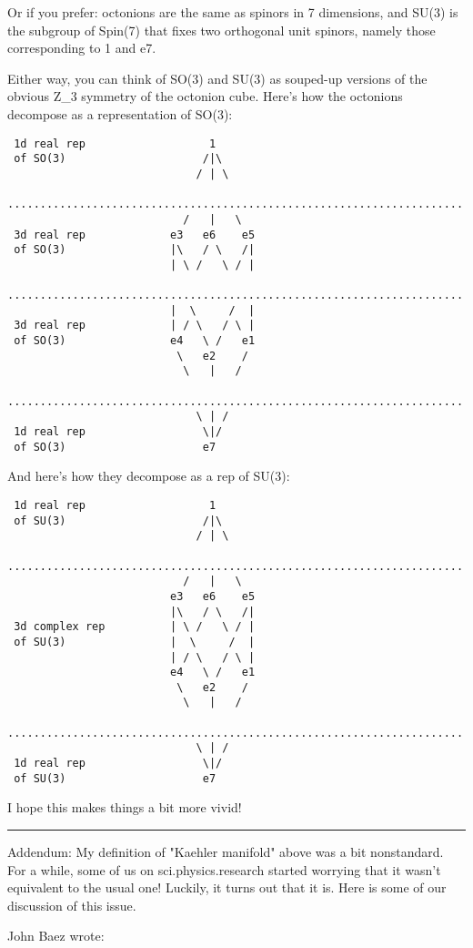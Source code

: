 Or if you prefer: octonions are the same as spinors in 7 dimensions, 
and SU(3) is the subgroup of Spin(7) that fixes two orthogonal 
unit spinors, namely those corresponding to 1 and e7.

Either way, you can think of SO(3) and SU(3) as souped-up versions
of the obvious Z_{3} symmetry of the octonion cube.  Here's how
the octonions decompose as a representation of SO(3):


\begin{verbatim}
 1d real rep                   1
 of SO(3)                     /|\
                             / | \
 ......................................................................
                           /   |   \          
 3d real rep             e3   e6    e5   
 of SO(3)                |\   / \   /| 
                         | \ /   \ / |
 ......................................................................
                         |  \     /  |
 3d real rep             | / \   / \ |
 of SO(3)                e4   \ /   e1 
                          \   e2    / 
                           \   |   /                       
 ......................................................................
                             \ | /
 1d real rep                  \|/
 of SO(3)                     e7
\end{verbatim}
    
And here's how they decompose as a rep of SU(3):



\begin{verbatim}
 1d real rep                   1
 of SU(3)                     /|\
                             / | \
 ......................................................................
                           /   |   \          
                         e3   e6    e5   
                         |\   / \   /| 
 3d complex rep          | \ /   \ / |
 of SU(3)                |  \     /  |
                         | / \   / \ |
                         e4   \ /   e1 
                          \   e2    / 
                           \   |   /                       
 ......................................................................
                             \ | /
 1d real rep                  \|/
 of SU(3)                     e7
\end{verbatim}
    
I hope this makes things a bit more vivid!  

\par\noindent\rule{\textwidth}{0.4pt}
Addendum: My definition of "Kaehler manifold" above was a bit
nonstandard.  For a while, some of us on sci.physics.research
started worrying that it wasn't equivalent to the usual one!  Luckily,
it turns out that it is.  Here is some of our discussion of this issue.

John Baez wrote:



